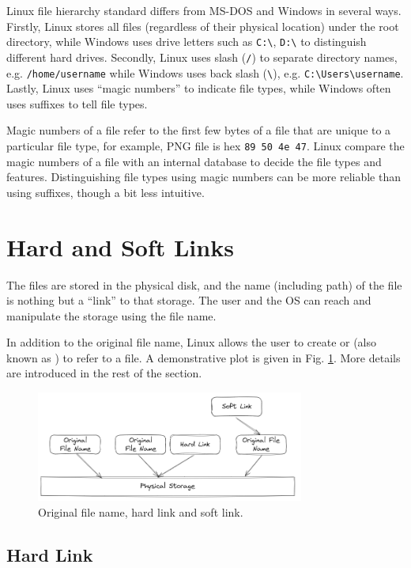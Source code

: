 Linux file hierarchy standard differs from MS-DOS and Windows in several ways. Firstly, Linux stores all files (regardless of their physical location) under the root directory, while Windows uses drive letters such as \verb|C:\|, \verb|D:\| to distinguish different hard drives. Secondly, Linux uses slash (\verb|/|) to separate directory names, e.g. \verb|/home/username| while Windows uses back slash (\verb|\|), e.g. \verb|C:\Users\username|. Lastly, Linux uses ``magic numbers'' to indicate file types, while Windows often uses suffixes to tell file types. 

Magic numbers of a file refer to the first few bytes of a file that are unique to a particular file type, for example, PNG file is hex \verb|89 50 4e 47|. Linux compare the magic numbers of a file with an internal database to decide the file types and features. Distinguishing file types using magic numbers can be more reliable than using suffixes, though a bit less intuitive.

\section{Hard and Soft Links}

The files are stored in the physical disk, and the name (including path) of the file is nothing but a ``link'' to that storage. The user and the OS can reach and manipulate the storage using the file name. 

In addition to the original file name, Linux allows the user to create  or  (also known as ) to refer to a file. A demonstrative plot is given in Fig. \ref{fig:hardsoftlink}. More details are introduced in the rest of the section.

\begin{figure}[!htb]
	\centering
	\includegraphics[width=250pt]{chapters/part-1/figures/hardsoftlink.png}
	\caption{Original file name, hard link and soft link.} \label{fig:hardsoftlink}
\end{figure} 

\subsection{Hard Link}

